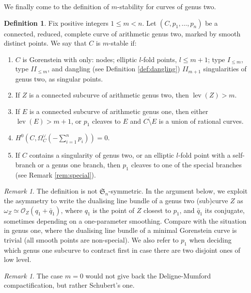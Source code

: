 \documentclass{compositio}
\newcommand{\OO}{\mathcal O}
\newcommand{\lev}{\operatorname{lev}}
\theoremstyle{plain}
\theoremstyle{definition}
\newtheorem{definition}[thm]{Definition}
\theoremstyle{remark}
\newtheorem{rem}[thm]{Remark}
\begin{document}
We finally come to the definition of $m$-stability for curves of genus two.
\begin{definition}\label{def:m-stability}
 Fix positive integers $1\leq m<n$. Let $(C,p_1,\ldots,p_n)$ be a connected, reduced, complete curve of arithmetic genus two, marked by smooth distinct points. We say that $C$ is $m$-stable if:
 \begin{enumerate}[leftmargin=.7cm]
  \item\label{cond:sing} $C$ is Gorenstein with only: nodes; elliptic $l$-fold points, $l\leq m+1$; type $I_{\leq m}$, type $I\!I_{\leq m}$, and dangling (see Definition \ref{def:dangling}) $I\!I_{m+1}$ singularities of genus two, as singular points.
  \item\label{cond:lev2} If $Z$ is a connected subcurve of arithmetic genus two, then $\lev(Z)>m$.
  \item\label{cond:lev1} If $E$ is a connected subcurve of arithmetic genus one, then either $\lev(E)>m+1$,
  or $p_1$ cleaves to $E$ and $\overline{C\setminus E}$ is a union of rational curves.
  \item\label{cond:aut} $H^0(C,\Omega_C^\vee(-\sum_{i=1}^n p_i))=0$.
  \item\label{cond:p1} If $C$ contains a singularity of genus two, or an elliptic $l$-fold point with a self-branch or a genus one branch, then $p_1$ cleaves to one of the special branches (see Remark \ref{rem:special}).
 \end{enumerate}
\end{definition}

\begin{rem}
 The definition is not $\mathfrak{S}_n$-symmetric. In the argument below, we exploit the asymmetry to write the dualising line bundle of a genus two (sub)curve $Z$ as $\omega_Z\simeq\OO_Z(q_1+\bar q_1)$, where $q_1$ is the point of $Z$ closest to $p_1$, and $\bar q_1$ its conjugate, sometimes depending on a one-parameter smoothing. Compare with the situation in genus one, where the dualising line bundle of a minimal Gorenstein curve is trivial (all smooth points are non-special). We also refer to $p_1$ when deciding which genus one subcurve to contract first in case there are two disjoint ones of low level.
\end{rem}

\begin{rem}
 The case $m=0$ would not give back the Deligne-Mumford compactification, but rather Schubert's one.
\end{rem}
\end{document}
